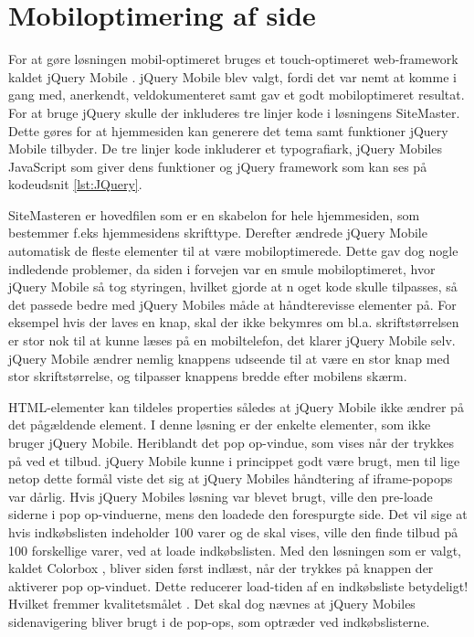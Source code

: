 \section{Mobiloptimering af side}
For at gøre løsningen mobil-optimeret bruges et touch-optimeret web-framework kaldet jQuery Mobile \citep{jquerymobile}. jQuery Mobile blev valgt, fordi det var nemt at komme i gang med, anerkendt, veldokumenteret samt gav et godt mobiloptimeret resultat. For at bruge jQuery skulle der inkluderes tre linjer kode i løsningens SiteMaster. Dette gøres for at hjemmesiden kan generere det tema samt funktioner jQuery Mobile tilbyder. De tre linjer kode inkluderer et typografiark, jQuery Mobiles JavaScript som giver dens funktioner og jQuery framework som kan ses på kodeudsnit \ref{lst:JQuery}.

SiteMasteren er hovedfilen som er en skabelon for hele hjemmesiden, som bestemmer f.eks hjemmesidens skrifttype. Derefter ændrede jQuery Mobile automatisk de fleste elementer til at være mobiloptimerede. Dette gav dog nogle indledende problemer, da siden i forvejen var en smule mobiloptimeret, hvor jQuery Mobile så tog styringen, hvilket gjorde at n oget kode skulle tilpasses, så det passede bedre med jQuery Mobiles måde at håndterevisse elementer på.
For eksempel hvis der laves en knap, skal der ikke bekymres om bl.a. skriftstørrelsen er stor nok til at kunne læses på en mobiltelefon, det klarer jQuery Mobile selv. jQuery Mobile ændrer nemlig knappens udseende til at være en stor knap med stor skriftstørrelse, og tilpasser knappens bredde efter mobilens skærm.

HTML-elementer kan tildeles properties således at jQuery Mobile ikke ændrer på det pågældende element. I denne løsning er der enkelte elementer, som ikke bruger jQuery Mobile. Heriblandt det pop op-vindue, som vises når der trykkes på  ved et tilbud. jQuery Mobile kunne i princippet godt være brugt, men til lige netop dette formål viste det sig at jQuery Mobiles håndtering af iframe-popops var dårlig. Hvis jQuery Mobiles løsning var blevet brugt, ville den pre-loade siderne i pop op-vinduerne, mens den loadede den forespurgte side.
Det vil sige at hvis indkøbslisten indeholder 100 varer og de skal vises, ville den finde tilbud på 100 forskellige varer, ved at loade indkøbslisten. Med den løsningen som er valgt, kaldet Colorbox \citep{colorbox}, bliver siden først indlæst, når der trykkes på knappen der aktiverer pop op-vinduet. Dette reducerer load-tiden af en indkøbsliste betydeligt! Hvilket fremmer kvalitetsmålet . Det skal dog nævnes at jQuery Mobiles sidenavigering bliver brugt i de pop-ops, som optræder ved indkøbslisterne. 